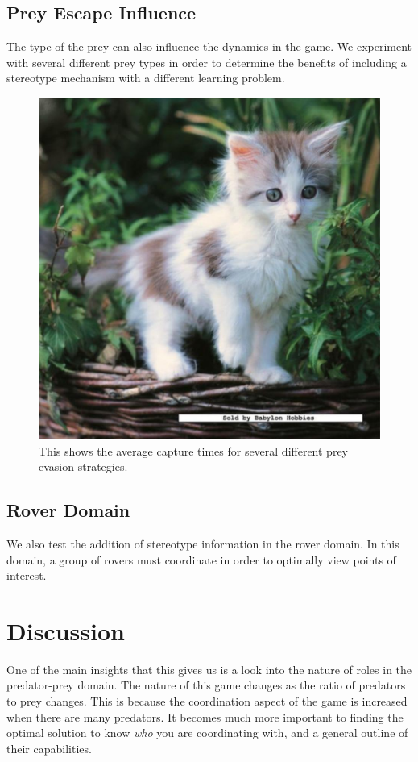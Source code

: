 \documentclass{aamas2014}
\begin{document}

\subsection{Prey Escape Influence}

The type of the prey can also influence the dynamics in the game. We experiment with several different prey types in order to determine the benefits of including a stereotype mechanism with a different learning problem.

\begin{figure}[h!]
\includegraphics[width=.5\textwidth]{pics/kitten}
\caption{This shows the average capture times for several different prey evasion strategies.}
\label{fig:evasion}
\end{figure}

\subsection{Rover Domain}

We also test the addition of stereotype information in the rover domain. In this domain, a group of rovers must coordinate in order to optimally view points of interest.



\section{Discussion}
\label{sec:discussion}


One of the main insights that this gives us is a look into the nature of roles in the predator-prey domain. The nature of this game changes as the ratio of predators to prey changes. This is because the coordination aspect of the game is increased when there are many predators. It becomes much more important to finding the optimal solution to know \emph{who} you are coordinating with, and a general outline of their capabilities.
\end{document}
